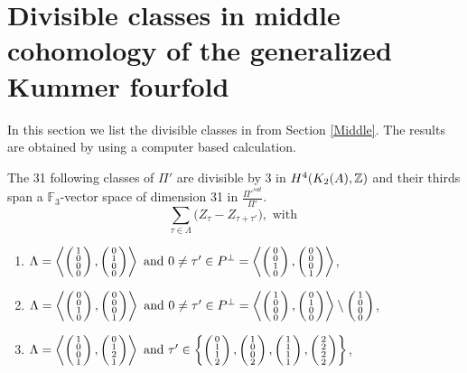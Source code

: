 
\section{Divisible classes in middle cohomology of the generalized Kummer fourfold}\label{SpecialClasses}
In this section we list the divisible classes in from Section \ref{Middle}. The results are obtained by using a computer based calculation.
\begin{prop}\label{XXXI}
The 31 following classes of $\Pi'$ are divisible by 3 in $H^{4}(K_2(A),\Z)$ and their thirds span a $\mathbb F_3$-vector space of dimension 31 in $\frac{\Pi'^{sat}}{\Pi'}$.
$$\sum_{\tau\in\Lambda} \Big(Z_{\tau} - Z_{\tau+\tau'}\Big), \text{ with }$$
\begin{enumerate}
\item
$\Lambda=\plan{1\\0\\0\\0}{0\\1\\0\\0} \text{ and } 0\neq \tau'\in P^\perp = \plan{0\\0\\1\\0}{0\\0\\0\\1} $,

\item
$\Lambda=\plan{0\\0\\1\\0}{0\\0\\0\\1}  \text{ and } 0\neq \tau' \in P^\perp = \plan{1\\0\\0\\0}{0\\1\\0\\0} \setminus \vect{1\\0\\0\\0}$,

\item
$\Lambda=\plan{1\\0\\0\\1}{0\\1\\2\\1} \text{ and } \tau' \in \left\{ \vect{0\\1\\1\\2},\vect{1\\0\\0\\2},\vect{1\\1\\1\\1},\vect{2\\2\\2\\2} \right\}$,


\end{enumerate}
\end{prop}
